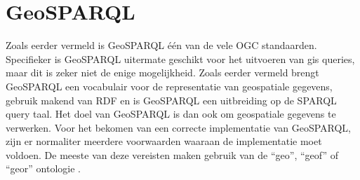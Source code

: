 \section{GeoSPARQL}
\label{sec:geosparql}

Zoals eerder vermeld is GeoSPARQL één van de vele OGC standaarden. Specifieker is GeoSPARQL uitermate geschikt voor het uitvoeren van \acrshort{gis} queries, maar dit is zeker niet de enige mogelijkheid. Zoals eerder vermeld brengt GeoSPARQL een vocabulair voor de representatie van geospatiale gegevens, gebruik makend van RDF en is GeoSPARQL een uitbreiding op de SPARQL query taal. Het doel van GeoSPARQL is dan ook om geospatiale gegevens te verwerken. Voor het bekomen van een correcte implementatie van GeoSPARQL, zijn er normaliter meerdere voorwaarden waaraan de implementatie moet voldoen. De meeste van deze vereisten maken gebruik van de ``geo'', ``geof'' of ``geor'' ontologie \cite{ogcdocs}.

